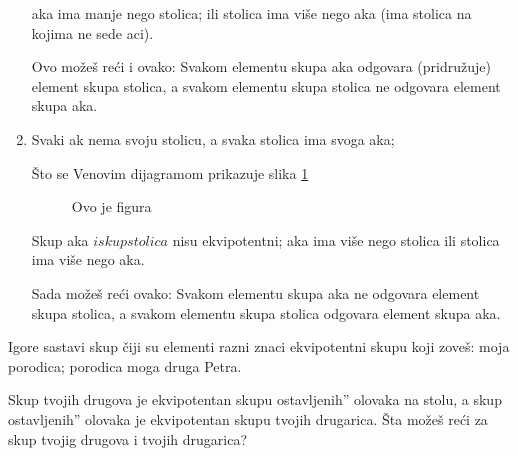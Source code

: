 \begin{enumerate}
            \DJ aka ima manje nego stolica; ili stolica ima vi\v se nego \dj aka (ima stolica na kojima ne sede \dj aci).



            Ovo mo\v ze\v s re\' ci i ovako: Svakom elementu skupa \dj aka odgovara (pridru\v zuje) element skupa stolica, a svakom elementu skupa stolica ne odgovara element skupa \dj aka.



            \item Svaki \dj ak nema svoju stolicu, a svaka stolica ima svoga \dj aka;



            \v Sto se Venovim dijagramom prikazuje slika \ref{slika3str27}

                    \begin{figure}[h]

                       \center


                       \caption{Ovo je figura}\label{slika3str27}

                    \end{figure}



            Skup \dj aka $ i skup stolica $ nisu ekvipotentni; \dj aka ima vi\v se nego stolica ili stolica ima vi\v se nego \dj aka.



            Sada mo\v ze\v s re\' ci ovako: Svakom elementu skupa \dj aka ne odgovara element skupa stolica, a svakom elementu skupa stolica odgovara element skupa \dj aka.

       \end{enumerate}

    \begin{zad}

        Igore sastavi skup \v ciji su elementi razni znaci ekvipotentni skupu koji zove\v s: moja porodica; porodica moga druga Petra.

    \end{zad}

    \begin{zad}

        Skup tvojih drugova je ekvipotentan skupu ostavljenih'' olovaka na stolu, a skup ostavljenih'' olovaka je ekvipotentan skupu tvojih drugarica. \v Sta mo\v ze\v s re\' ci za skup tvojig drugova i tvojih drugarica?



        

        

    \end{zad}

